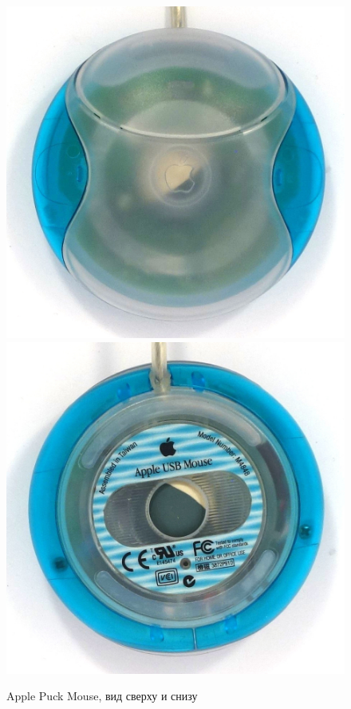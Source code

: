 \documentclass[11pt, a4paper]{article}
\begin{document}
\begin{figure}[h]
    \centering
    \includegraphics[scale=0.65]{1998_apple_puck/appleup60.jpg}
    \includegraphics[scale=0.65]{1998_apple_puck/appledown60.jpg}
    \caption{Apple Puck Mouse, вид сверху и снизу}
    \label{fig:top}
\end{figure}
\end{document}
